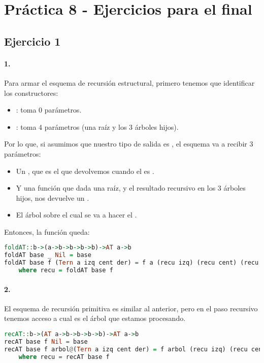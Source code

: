 \section*{Práctica 8 - Ejercicios para el final}

\subsection*{Ejercicio 1}

\paragraph{1.} Para armar el esquema de recursión estructural, primero tenemos que identificar los constructores:
\begin{itemize}
  \item {}: toma 0 parámetros.
  \item {}: toma 4 parámetros (una raíz y los 3 árboles hijos).
\end{itemize}

Por lo que, si asumimos que nuestro tipo de salida es , el esquema  va a recibir 3 parámetros:
\begin{itemize}
  \item Un , que es el que devolvemos cuando el  es .
  \item Y una función  que dada una raíz, y el resultado recursivo en los 3 árboles hijos, nos devuelve un .
  \item El árbol  sobre el cual se va a hacer el .
\end{itemize}

Entonces, la función queda:
\begin{lstlisting}[language=Haskell]
foldAT::b->(a->b->b->b->b)->AT a->b
foldAT base _ Nil = base
foldAT base f (Tern a izq cent der) = f a (recu izq) (recu cent) (recu der)
    where recu = foldAT base f
\end{lstlisting}

\paragraph{2.} El esquema de recursión primitiva es similar al anterior, pero en el paso recursivo tenemos acceso a cual es el árbol que estamos procesando.

\begin{lstlisting}[language=Haskell]
recAT::b->(AT a->b->b->b->b)->AT a->b
recAT base f Nil = base
recAT base f arbol@(Tern a izq cent der) = f arbol (recu izq) (recu cent) (recu der)
    where recu = recAT base f
\end{lstlisting}

